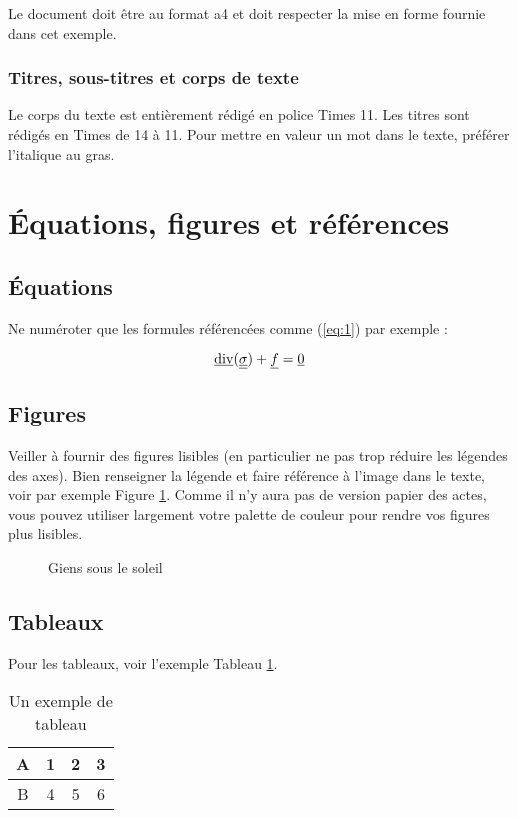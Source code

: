 \documentclass{CSMA2017}
\begin{document}
Le document doit être au format a4 et doit respecter la mise en forme fournie dans cet exemple.

\subsubsection{Titres, sous-titres et corps de texte}
Le corps du texte est entièrement rédigé en police Times 11. Les titres sont rédigés en Times de 14 à 11. Pour mettre en valeur un mot dans le texte, préférer l'italique au gras.


\section{Équations, figures et références}

\subsection{Équations}

Ne numéroter que les formules référencées comme (\ref{eq:1}) par exemple :

\begin{equation}\label{eq:1}
\underline{\mathop{\rm div}\nolimits} (\underline {\underline {\sigma}}) + \underline{f} = \underline{0}
\end{equation}

\subsection{Figures}

Veiller à fournir des figures lisibles (en particulier ne pas trop réduire les légendes des axes). Bien renseigner la légende et faire référence à l'image dans le texte, voir par exemple Figure \ref{fig:Giens}. Comme il n'y aura pas de version papier des actes, vous pouvez utiliser largement votre palette de couleur pour rendre vos figures plus lisibles.

\begin{figure}[!htb]
\centering
\caption{Giens sous le soleil}
\label{fig:Giens}
\end{figure}

\subsection{Tableaux}

Pour les tableaux, voir l'exemple Tableau \ref{Tab:tab1}.

\begin{table}[htbp]
\caption{Un exemple de tableau}
\begin{center}
\begin{tabular}{|c|c|c|c|}
\hline
A&1&2&3\\
\hline
B&4&5&6\\
\hline
\end{tabular}
\end{center}
\label{Tab:tab1}
\end{table}%
\end{document}
